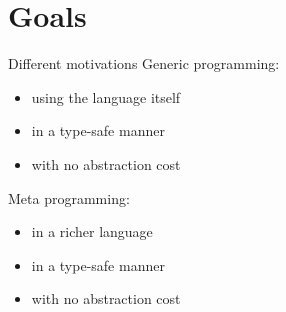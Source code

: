 \documentclass{beamer}
\author{Guillaume Allais}
\institute{University of Strathclyde}
\date{PLUG \\ November 8$^{th}$ 2023}
\begin{document}
\begin{frame}
  \maketitle
\end{frame}

\section{Goals}

\begin{frame}{Different motivations}
Generic programming:

\begin{itemize}
  \item using the language itself
  \item in a type-safe manner
  \item with no abstraction cost
\end{itemize}

\bigskip

Meta programming:

\begin{itemize}
  \item in a richer language
  \item in a type-safe manner
  \item with no abstraction cost
\end{itemize}
\end{frame}
\end{document}
